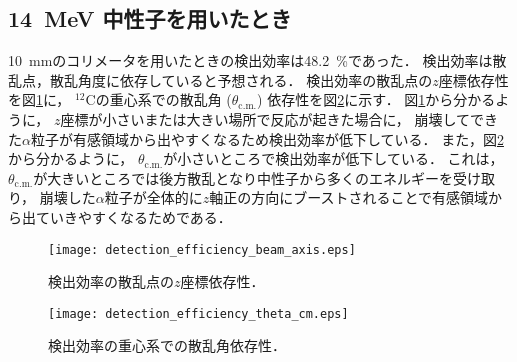 \documentclass[../master]{subfiles}
\begin{document}
\subsection{14~MeV 中性子を用いたとき}
\SI{10}{\milli\metre}のコリメータを用いたときの検出効率は\SI{48.2}{\percent}であった．
検出効率は散乱点，散乱角度に依存していると予想される．
検出効率の散乱点の$z$座標依存性を図\ref{fig::detection_efficiency_beam_axis}に，
${}^{12}\mathrm{C}$の重心系での散乱角 ($\theta_{\text{c.m.}}$) 依存性を図\ref{fig::detection_efficiency_theta_cm}に示す．
図\ref{fig::detection_efficiency_beam_axis}から分かるように，
$z$座標が小さいまたは大きい場所で反応が起きた場合に，
崩壊してできた$\alpha$粒子が有感領域から出やすくなるため検出効率が低下している．
また，図\ref{fig::detection_efficiency_theta_cm}から分かるように，
$\theta_{\text{c.m.}}$が小さいところで検出効率が低下している．
これは，$\theta_{\text{c.m.}}$が大きいところでは後方散乱となり中性子から多くのエネルギーを受け取り，
崩壊した$\alpha$粒子が全体的に$z$軸正の方向にブーストされることで有感領域から出ていきやすくなるためである．
\begin{figure}
  \centering
  \texttt{[image: detection\_efficiency\_beam\_axis.eps]}
  \caption{検出効率の散乱点の$z$座標依存性．}
  \label{fig::detection_efficiency_beam_axis}
\end{figure}
\begin{figure}
  \centering
  \texttt{[image: detection\_efficiency\_theta\_cm.eps]}
  \caption{検出効率の重心系での散乱角依存性．}
  \label{fig::detection_efficiency_theta_cm}
\end{figure}
\end{document}
